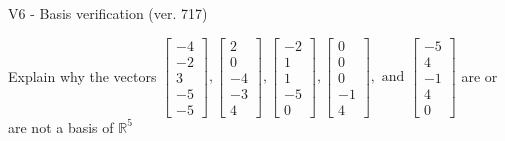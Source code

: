 \begin{exercise}
  \begin{exerciseTitle}V6 - Basis verification (ver. 717)\end{exerciseTitle}
  \begin{exerciseStatement}
    Explain why the vectors \(\left[\begin{array}{r}
-4 \\
-2 \\
3 \\
-5 \\
-5
\end{array}\right] , \left[\begin{array}{r}
2 \\
0 \\
-4 \\
-3 \\
4
\end{array}\right] , \left[\begin{array}{r}
-2 \\
1 \\
1 \\
-5 \\
0
\end{array}\right] , \left[\begin{array}{r}
0 \\
0 \\
0 \\
-1 \\
4
\end{array}\right] , \text{ and } \left[\begin{array}{r}
-5 \\
4 \\
-1 \\
4 \\
0
\end{array}\right]\) are or are not a basis of \(\mathbb{R}^5\)	



\end{exerciseStatement}
\end{exercise}
